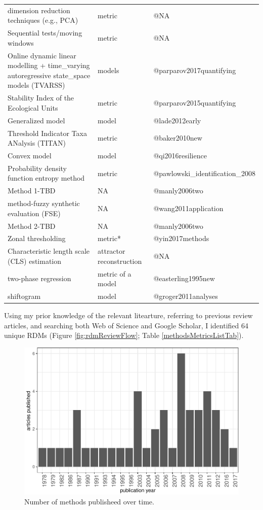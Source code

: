 \documentclass[12pt,twoside,openany]{reedthesis}
\begin{document}
\begin{longtable}{lll}
dimension reduction techniques (e.g., PCA) & metric & @NA\\
\addlinespace
Sequential tests/moving windows & metric & @NA\\
Online dynamic linear modelling +  time\_varying autoregressive state\_space models (TVARSS) & models & @parparov2017quantifying\\
Stability Index of the Ecological Units & metric & @parparov2015quantifying\\
Generalized model & model & @lade2012early\\
Threshold Indicator Taxa ANalysis (TITAN) & metric & @baker2010new\\
\addlinespace
Convex model & model & @qi2016resilience\\
Probability density function entropy method & metric & @pawlowski\_identification\_2008\\
Method 1-TBD & NA & @manly2006two\\
method-fuzzy synthetic evaluation (FSE) & NA & @wang2011application\\
Method 2-TBD & NA & @manly2006two\\
\addlinespace
Zonal thresholding & metric* & @yin2017methods\\
Characteristic length scale (CLS) estimation & attractor reconstruction & @NA\\
two-phase regression & metric of a model & @easterling1995new\\
shiftogram & model & @groger2011analyses\\*
\end{longtable}
Using my prior knowledge of the relevant litearture, referring to
previous review articles, and searching both Web of Science and Google
Scholar, I identified 64 unique RDMs (Figure \ref{fig:rdmReviewFlow};
Table \ref{methodsMetricsListTab}).
\begin{figure}
\centering
\includegraphics{_myDissertation_files/figure-latex/jrnlYearFig-1.pdf}
\caption{\label{fig:jrnlYearFig}Number of methods publisheed over time.}
\end{figure}
\end{document}
